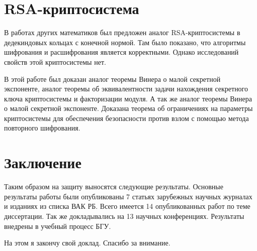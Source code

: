 \documentclass[a4paper,12pt]{article} %
\begin{document}
\section{RSA-криптосистема}

В работах других математиков был предложен аналог RSA-криптосистемы в дедекиндовых кольцах с конечной нормой.
Там было показано, что алгоритмы шифрования и расшифрования является корректными.
Однако исследований свойств этой криптосистемы нет.

В этой работе был доказан аналог теоремы Винера о малой секретной экспоненте, аналог теоремы об эквивалентности задачи нахождения секретного ключа криптосистемы и факторизации модуля.
А так же аналог теоремы Винера о малой секретной экспоненте.
Доказана теорема об ограничениях на параметры криптосистемы для обеспечения безопасности против взлом с помощью метода повторного шифрования.

\section{Заключение}

Таким образом на защиту выносятся следующие результаты.
Основные результаты работы были опубликованы 7 статьях зарубежных научных журналах и изданиях из списка ВАК РБ.
Всего имеется 14 опубликованных работ по теме диссертации.
Так же докладывались на 13 научных конференциях.
Результаты внедрены в учебный процесс БГУ.

На этом я закончу свой доклад.
Спасибо за внимание.
\end{document}
